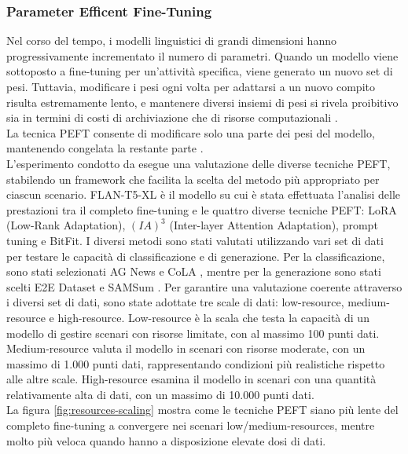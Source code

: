\subsubsection{Parameter Efficent Fine-Tuning}
Nel corso del tempo, i modelli linguistici di grandi dimensioni hanno progressivamente incrementato il numero di parametri. Quando un modello viene sottoposto a fine-tuning per un'attività specifica, viene generato un nuovo set di pesi. Tuttavia, modificare i pesi ogni volta per adattarsi a un nuovo compito risulta estremamente lento, e mantenere diversi insiemi di pesi si rivela proibitivo sia in termini di costi di archiviazione che di risorse computazionali \cite{pu2023empiricalanalysisstrengthsweaknesses}.\\
La tecnica PEFT consente di modificare solo una parte dei pesi del modello, mantenendo congelata la restante parte \cite{mao2021unipelt}.\\
L'esperimento condotto da \cite{pu2023empiricalanalysisstrengthsweaknesses} esegue una valutazione delle diverse tecniche PEFT, stabilendo un framework che facilita la scelta del metodo più appropriato per ciascun scenario.
FLAN-T5-XL \cite{chung2024scaling} è il modello su cui è stata effettuata l'analisi delle prestazioni tra il completo fine-tuning e le quattro diverse tecniche PEFT: LoRA (Low-Rank Adaptation), \((IA)^3\) (Inter-layer Attention Adaptation), prompt tuning e BitFit.
I diversi metodi sono stati valutati utilizzando vari set di dati per testare le capacità di classificazione e di generazione. Per la classificazione, sono stati selezionati AG News \cite{zhang2015character} e CoLA \cite{warstadt2019neural}, mentre per la generazione sono stati scelti E2E Dataset \cite{novikova2017e2e} e SAMSum \cite{gliwa2019samsum}.
Per garantire una valutazione coerente attraverso i diversi set di dati, sono state adottate tre scale di dati: low-resource, medium-resource e high-resource.
Low-resource è la scala che testa la capacità di un modello di gestire scenari con risorse limitate, con al massimo 100 punti dati.
Medium-resource valuta il modello in scenari con risorse moderate, con un massimo di 1.000 punti dati, rappresentando condizioni più realistiche rispetto alle altre scale.
High-resource esamina il modello in scenari con una quantità relativamente alta di dati, con un massimo di 10.000 punti dati.\\
La figura \ref{fig:resources-scaling} mostra come le tecniche PEFT siano più lente del completo fine-tuning a convergere nei scenari low/medium-resources, mentre molto più veloca quando hanno a disposizione elevate dosi di dati.
